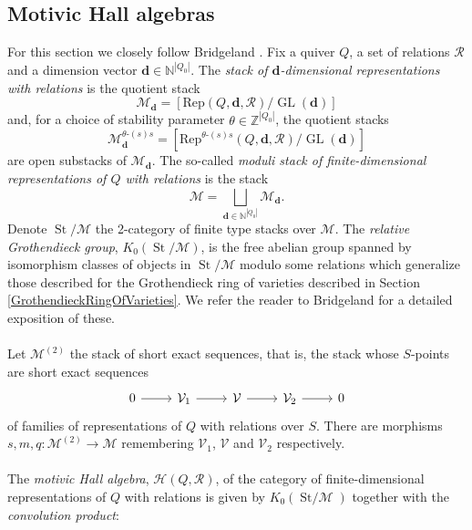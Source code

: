 \documentclass{amsart}
\theoremstyle{plain}
\numberwithin{equation}{section}
\theoremstyle{definition}
\theoremstyle{remark}
\begin{document}
	\subsection{Motivic Hall algebras}\label{motivicHallAlgebrasSection}
	For this section we closely follow Bridgeland \cite{BridgelandIntroMotivicHallAlgebras}. Fix a quiver $Q$, a set of relations $\mathcal{R}$ and a dimension vector $\mathbf{d}\in \mathbb{N}^{|Q_0|}$. The \emph{stack of $\mathbf{d}$-dimensional representations with relations} is the quotient stack 
	$$
	\mathscr{M}_{\mathbf{d}}=[\text{Rep}(Q,\mathbf{d},\mathcal{R})/\operatorname{GL}(\mathbf{d})]
	$$
	and, for a choice of stability parameter $\theta\in \mathbb{Z}^{|Q_0|}$, the quotient stacks 
	$$
	\mathscr{M}^{\theta\text{-}(s)s}_{\mathbf{d}}=[\text{Rep}^{\theta\text{-}(s)s}(Q,\mathbf{d},\mathcal{R})/\operatorname{GL}(\mathbf{d})]
	$$
	are open substacks of $\mathscr{M}_\mathbf{d}$. 
	The so-called \emph{moduli stack of finite-dimensional representations of $Q$ with relations} is the stack 
	$$
	\mathscr{M}=\bigsqcup_{\mathbf{d}\in\mathbb{N}^{|Q_0|}}\mathscr{M}_\mathbf{d}.
	$$
	Denote $\operatorname{St}/\mathscr{M}$ the 2-category of finite type stacks over $\mathscr{M}$. The \emph{relative Grothendieck group}, $K_0(\operatorname{St}/\mathscr{M})$, is the free abelian group spanned by isomorphism classes of objects in $\operatorname{St}/\mathscr{M}$ modulo some relations which generalize those described for the Grothendieck ring of varieties described in Section \ref{GrothendieckRingOfVarieties}. We refer the reader to Bridgeland \cite[Section 3.4]{BridgelandIntroMotivicHallAlgebras} for a detailed exposition of these. 
	\\
	\\
	Let $\mathscr{M}^{(2)}$ the stack of short exact sequences, that is, the stack whose $S$-points are short exact sequences
	\begin{equation}\label{objectsStackExactSequences}
		\begin{tikzcd}[column sep =normal, row sep =normal]
			0\arrow[r]& \mathcal{V}_1\arrow[r]&\mathcal{V}\arrow[r]&\mathcal{V}_2\arrow[r]&0
		\end{tikzcd}
	\end{equation}
	of families of representations of $Q$ with relations over $S$. There are morphisms $s,m,q:\mathscr{M}^{(2)}\to \mathscr{M}$ remembering $\mathcal{V}_1$, $\mathcal{V}$ and $\mathcal{V}_2$ respectively. 
	\\
	\\
	The \emph{motivic Hall algebra}, $\mathcal{H}(Q,\mathcal{R})$, of the category of finite-dimensional representations of $Q$ with relations is given by $K_0(\operatorname{St/\mathscr{M}})$ together with the \emph{convolution product}:
\end{document}
